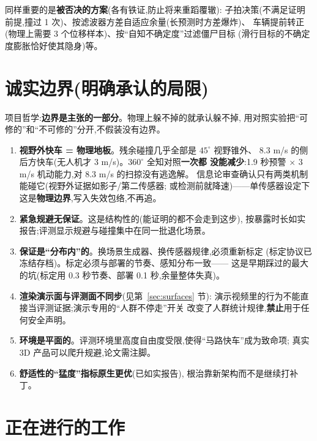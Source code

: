 \documentclass[11pt]{ctexart}
\begin{document}
同样重要的是\textbf{被否决的方案}(各有铁证,防止将来重蹈覆辙):
子拍决策(不满足证明前提,撞过 1 次)、按滤波器方差自适应余量(长预测时方差爆炸)、
车辆提前转正(物理上需要 3 个位移样本)、按``自知不确定度''过滤僵尸目标
(滑行目标的不确定度膨胀恰好使其隐身)等。

\section{诚实边界(明确承认的局限)}\label{sec:honest}

项目哲学:\textbf{边界是主张的一部分}。物理上躲不掉的就承认躲不掉,
用对照实验把``可修的''和``不可修的''分开,不假装没有边界。

\begin{enumerate}
  \item \textbf{视野外快车 = 物理地板}。残余碰撞几乎全部是 $45^\circ$ 视野锥外、
        8.3 m/s 的侧后方快车(无人机才 3 m/s)。$360^\circ$ 全知对照\textbf{一次都
        没能减少}:1.9 秒预警 $\times$ 3 m/s 机动能力,对 8.3 m/s 的扫掠没有逃逸解。
        信息论审查确认只有两类机制能碰它(视野外证据如影子/第二传感器;
        或检测前就降速)——单传感器设定下这是\textbf{物理边界},写入失效包络,不再追。
  \item \textbf{紧急规避无保证}。这是结构性的(能证明的都不会走到这步),
        按暴露时长如实报告;评测显示规避与碰撞集中在同一批退化场景。
  \item \textbf{保证是``分布内''的}。换场景生成器、换传感器规律,必须重新标定
        (标定协议已冻结存档)。标定必须与部署的节奏、感知分布一致——
        这是早期踩过的最大的坑(标定用 0.3 秒节奏、部署 0.1 秒,余量整体失真)。
  \item \textbf{渲染演示面与评测面不同步}(见第~\ref{sec:surfaces} 节):
        演示视频里的行为不能直接当评测证据;演示专用的``人群不停走''开关
        改变了人群统计规律,\textbf{禁止}用于任何安全声明。
  \item \textbf{环境是平面的}。评测环境里高度自由度受限,使得``马路快车''成为致命项;
        真实 3D 产品可以爬升规避,论文需注脚。
  \item \textbf{舒适性的``猛度''指标原生更优}(已如实报告),
        根治靠新架构而不是继续打补丁。
\end{enumerate}

\section{正在进行的工作}\label{sec:ongoing}
\end{document}
